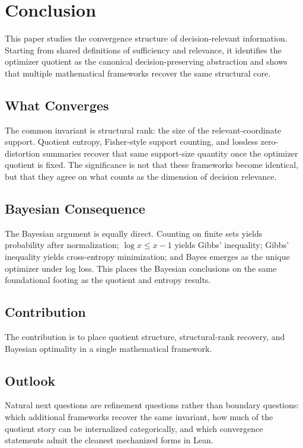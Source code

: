 \section{Conclusion}

This paper studies the convergence structure of decision-relevant information. Starting from shared definitions of sufficiency and relevance, it identifies the optimizer quotient as the canonical decision-preserving abstraction and shows that multiple mathematical frameworks recover the same structural core.

\subsection*{What Converges}

The common invariant is structural rank: the size of the relevant-coordinate support. Quotient entropy, Fisher-style support counting, and lossless zero-distortion summaries recover that same support-size quantity once the optimizer quotient is fixed. The significance is not that these frameworks become identical, but that they agree on what counts as the dimension of decision relevance.

\subsection*{Bayesian Consequence}

The Bayesian argument is equally direct. Counting on finite sets yields probability after normalization; $\log x \le x - 1$ yields Gibbs' inequality; Gibbs' inequality yields cross-entropy minimization; and Bayes emerges as the unique optimizer under log loss. This places the Bayesian conclusions on the same foundational footing as the quotient and entropy results.

\subsection*{Contribution}

The contribution is to place quotient structure, structural-rank recovery, and Bayesian optimality in a single mathematical framework.

\subsection*{Outlook}

Natural next questions are refinement questions rather than boundary questions: which additional frameworks recover the same invariant, how much of the quotient story can be internalized categorically, and which convergence statements admit the cleanest mechanized forms in Lean.
